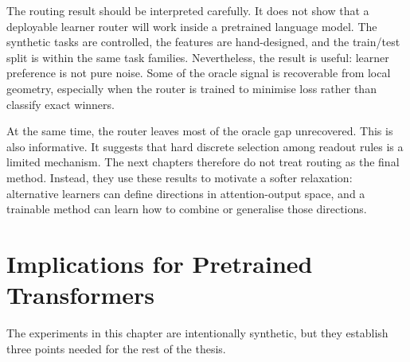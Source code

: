\begin{table}[t]
\centering
\small
{}
\caption{Loss-aware MLP routing over a reduced four-learner action set. The router recovers part, but far from all, of the oracle learner-selection gap. Values report mean \(\pm\) standard deviation over three seeds.}\label{tab:synthetic_router}
\end{table}

The routing result should be interpreted carefully. It does not show that a deployable learner router will work inside a pretrained language model. The synthetic tasks are controlled, the features are hand-designed, and the train/test split is within the same task families. Nevertheless, the result is useful: learner preference is not pure noise. Some of the oracle signal is recoverable from local geometry, especially when the router is trained to minimise loss rather than classify exact winners.

At the same time, the router leaves most of the oracle gap unrecovered. This is also informative. It suggests that hard discrete selection among readout rules is a limited mechanism. The next chapters therefore do not treat routing as the final method. Instead, they use these results to motivate a softer relaxation: alternative learners can define directions in attention-output space, and a trainable method can learn how to combine or generalise those directions.

\section{Implications for Pretrained Transformers}\label{sec:ttr_implications_for_transformers}

The experiments in this chapter are intentionally synthetic, but they establish three points needed for the rest of the thesis.

